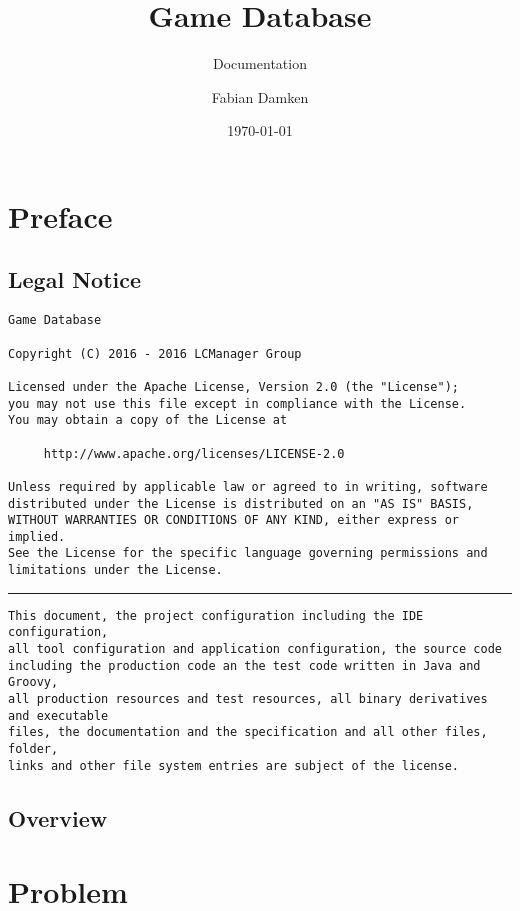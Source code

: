 \documentclass{scrreprt}
\title{Game Database}
\subtitle{Documentation}
\author{Fabian Damken}
\date{\today}
\begin{document}
	\maketitle
	\tableofcontents

	\chapter{Preface}
		\label{c:preface}

		\section{Legal Notice}
			\label{s:preface_legal_notice}

			\begin{verbatim}
Game Database

Copyright (C) 2016 - 2016 LCManager Group

Licensed under the Apache License, Version 2.0 (the "License");
you may not use this file except in compliance with the License.
You may obtain a copy of the License at

     http://www.apache.org/licenses/LICENSE-2.0

Unless required by applicable law or agreed to in writing, software
distributed under the License is distributed on an "AS IS" BASIS,
WITHOUT WARRANTIES OR CONDITIONS OF ANY KIND, either express or implied.
See the License for the specific language governing permissions and
limitations under the License.
			\end{verbatim}

			\rule{\linewidth}{1pt}

			\begin{verbatim}
This document, the project configuration including the IDE configuration,
all tool configuration and application configuration, the source code
including the production code an the test code written in Java and Groovy,
all production resources and test resources, all binary derivatives and executable
files, the documentation and the specification and all other files, folder,
links and other file system entries are subject of the license.
			\end{verbatim}


		\section{Overview}
			\label{s:preface_overview}

	\chapter{Problem}
		\label{c:problem}
\end{document}
